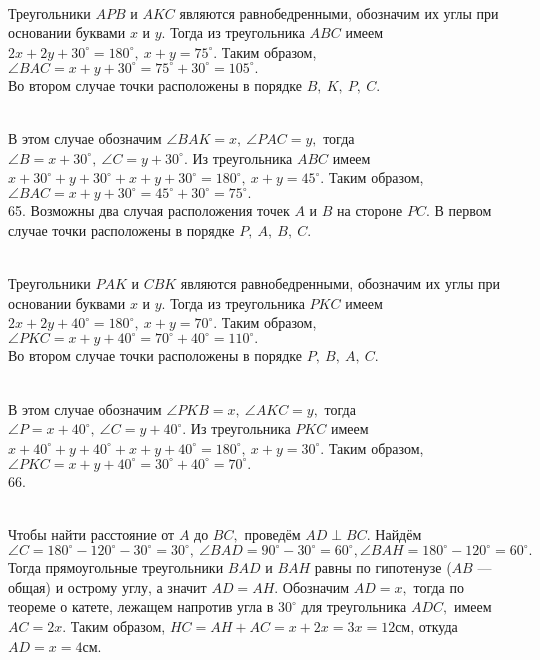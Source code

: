 \begin{figure}[ht!]
\end{figure}\\
Треугольники $APB$ и $AKC$ являются равнобедренными, обозначим их углы при основании буквами $x$ и $y.$ Тогда из треугольника $ABC$ имеем $2x+2y+30^\circ=180^\circ,\ x+y=75^\circ.$ Таким образом, $\angle BAC=x+y+30^\circ=75^\circ+30^\circ=105^\circ.$\\
Во втором случае точки расположены в порядке $B,\ K,\ P,\ C.$
\begin{figure}[ht!]
\end{figure}\\
В этом случае обозначим $\angle BAK=x,\ \angle PAC=y,$ тогда $\angle B=x+30^\circ,\ \angle C=y+30^\circ.$ Из треугольника $ABC$ имеем $x+30^\circ+y+30^\circ+x+y+30^\circ=180^\circ,\ x+y=45^\circ.$ Таким образом, $\angle BAC=x+y+30^\circ=45^\circ+30^\circ=75^\circ.$\\
65. Возможны два случая расположения точек $A$ и $B$ на стороне $PC.$ В первом случае точки расположены в порядке $P,\ A,\ B,\ C.$
\begin{figure}[ht!]
\end{figure}\\
Треугольники $PAK$ и $CBK$ являются равнобедренными, обозначим их углы при основании буквами $x$ и $y.$ Тогда из треугольника $PKC$ имеем $2x+2y+40^\circ=180^\circ,\ x+y=70^\circ.$ Таким образом, $\angle PKC=x+y+40^\circ=70^\circ+40^\circ=110^\circ.$\\
Во втором случае точки расположены в порядке $P,\ B,\ A,\ C.$
\begin{figure}[ht!]
\end{figure}\\
В этом случае обозначим $\angle PKB=x,\ \angle AKC=y,$ тогда $\angle P=x+40^\circ,\ \angle C=y+40^\circ.$ Из треугольника $PKC$ имеем $x+40^\circ+y+40^\circ+x+y+40^\circ=180^\circ,\ x+y=30^\circ.$ Таким образом, $\angle PKC=x+y+40^\circ=30^\circ+40^\circ=70^\circ.$\\
66. \begin{figure}[ht!]
\end{figure}\\
Чтобы найти расстояние от $A$ до $BC,$ проведём $AD\perp BC.$ Найдём $\angle C=180^\circ-120^\circ-30^\circ=30^\circ,\ \angle BAD=90^\circ-30^\circ=60^\circ, \angle BAH=180^\circ-120^\circ=60^\circ.$ Тогда прямоугольные треугольники $BAD$ и $BAH$ равны по гипотенузе ($AB$ --- общая) и острому углу, а значит $AD=AH.$ Обозначим $AD=x,$ тогда по теореме о катете, лежащем напротив угла в $30^\circ$ для треугольника $ADC,$ имеем $AC=2x.$ Таким образом, $HC=AH+AC=x+2x=3x=12$см, откуда $AD=x=4$см.\\
